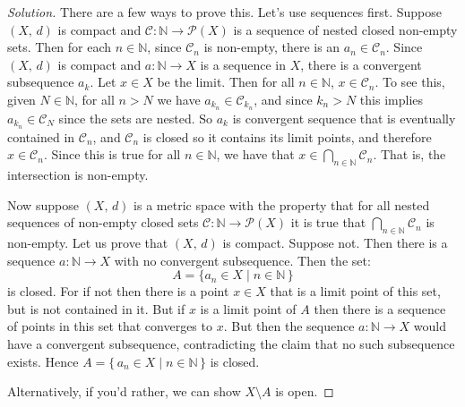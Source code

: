 \documentclass{article}
\theoremstyle{normal}
\begin{document}
    \begin{proof}[Solution]
        There are a few ways to prove this. Let's use sequences first.
        Suppose $(X,\,d)$ is compact and
        $\mathcal{C}:\mathbb{N}\rightarrow\mathcal{P}(X)$ is a sequence of
        nested closed non-empty sets. Then for each
        $n\in\mathbb{N}$, since $\mathcal{C}_{n}$ is non-empty, there is an
        $a_{n}\in\mathcal{C}_{n}$. Since $(X,\,d)$ is compact and
        $a:\mathbb{N}\rightarrow{X}$ is a sequence in $X$, there is a
        convergent subsequence $a_{k}$. Let $x\in{X}$ be the limit. Then
        for all $n\in\mathbb{N}$, $x\in\mathcal{C}_{n}$. To see this, given
        $N\in\mathbb{N}$, for all $n>N$ we have
        $a_{k_{n}}\in\mathcal{C}_{k_{n}}$, and since $k_{n}>N$ this implies
        $a_{k_{n}}\in\mathcal{C}_{N}$ since the sets are nested. So
        $a_{k}$ is convergent sequence that is eventually contained in
        $\mathcal{C}_{n}$, and $\mathcal{C}_{n}$ is closed so it contains its
        limit points, and therefore $x\in\mathcal{C}_{n}$. Since this is true
        for all $n\in\mathbb{N}$, we have that
        $x\in\bigcap_{n\in\mathbb{N}}\mathcal{C}_{n}$. That is, the intersection
        is non-empty.
        \par\hfill\par
        Now suppose $(X,\,d)$ is a metric space with the property that for
        all nested sequences of non-empty closed sets
        $\mathcal{C}:\mathbb{N}\rightarrow\mathcal{P}(X)$ it is true that
        $\bigcap_{n\in\mathbb{N}}\mathcal{C}_{n}$ is non-empty. Let us prove
        that $(X,\,d)$ is compact. Suppose not. Then there is a sequence
        $a:\mathbb{N}\rightarrow{X}$ with no convergent subsequence. Then the
        set:
        \begin{equation}
            A=\{a_{n}\in{X}\;|\;n\in\mathbb{N}\,\}
        \end{equation}
        is closed. For if not then there is a point $x\in{X}$ that is a limit
        point of this set, but is not contained in it. But if $x$ is a
        limit point of $A$ then there is a sequence of points in this set that
        converges to $x$. But then the sequence
        $a:\mathbb{N}\rightarrow{X}$ would have a convergent subsequence,
        contradicting the claim that no such subsequence exists. Hence
        $A=\{\,a_{n}\in{X}\;|\;n\in\mathbb{N}\,\}$ is closed.
        \par\hfill\par
        Alternatively, if you'd rather, we can show $X\setminus{A}$ is open.

\end{proof}
\end{document}
